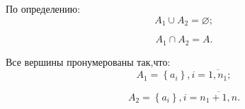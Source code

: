 По определению:
$$
A_1 \cup A_2 = \varnothing;
$$

$$
A_1 \cap A_2 = A.
$$

Все вершины пронумерованы так,что:
$$
A_1 = \left\{a_i \right\}, i= \overline{1,n_1};
$$

$$
A_2 = \left\{ a_i  \right\}, i= \overline{n_1+1,n}.
$$










